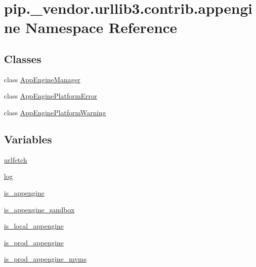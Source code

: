 \hypertarget{namespacepip_1_1__vendor_1_1urllib3_1_1contrib_1_1appengine}{}\section{pip.\+\_\+vendor.\+urllib3.\+contrib.\+appengine Namespace Reference}
\label{namespacepip_1_1__vendor_1_1urllib3_1_1contrib_1_1appengine}
\subsection*{Classes}
\begin{DoxyCompactItemize}
\item 
class \hyperlink{classpip_1_1__vendor_1_1urllib3_1_1contrib_1_1appengine_1_1AppEngineManager}{App\+Engine\+Manager}
\item 
class \hyperlink{classpip_1_1__vendor_1_1urllib3_1_1contrib_1_1appengine_1_1AppEnginePlatformError}{App\+Engine\+Platform\+Error}
\item 
class \hyperlink{classpip_1_1__vendor_1_1urllib3_1_1contrib_1_1appengine_1_1AppEnginePlatformWarning}{App\+Engine\+Platform\+Warning}
\end{DoxyCompactItemize}
\subsection*{Variables}
\begin{DoxyCompactItemize}
\item 
\hyperlink{namespacepip_1_1__vendor_1_1urllib3_1_1contrib_1_1appengine_a43bcc7d1059815293b9969954bfe2854}{urlfetch}
\item 
\hyperlink{namespacepip_1_1__vendor_1_1urllib3_1_1contrib_1_1appengine_a11755208f8de682c059b7329b78c96e0}{log}
\item 
\hyperlink{namespacepip_1_1__vendor_1_1urllib3_1_1contrib_1_1appengine_adeaee65e7765924563778db31118b78c}{is\+\_\+appengine}
\item 
\hyperlink{namespacepip_1_1__vendor_1_1urllib3_1_1contrib_1_1appengine_a5dee34caa3af4d9bd1687c3cc72847a6}{is\+\_\+appengine\+\_\+sandbox}
\item 
\hyperlink{namespacepip_1_1__vendor_1_1urllib3_1_1contrib_1_1appengine_a6166783c78cd832aea184120e9d9eac4}{is\+\_\+local\+\_\+appengine}
\item 
\hyperlink{namespacepip_1_1__vendor_1_1urllib3_1_1contrib_1_1appengine_afedea0831b9c11a55d44748b7366459a}{is\+\_\+prod\+\_\+appengine}
\item 
\hyperlink{namespacepip_1_1__vendor_1_1urllib3_1_1contrib_1_1appengine_a6ab46ac46fee4fba79b08854e0e484df}{is\+\_\+prod\+\_\+appengine\+\_\+mvms}
\end{DoxyCompactItemize}


